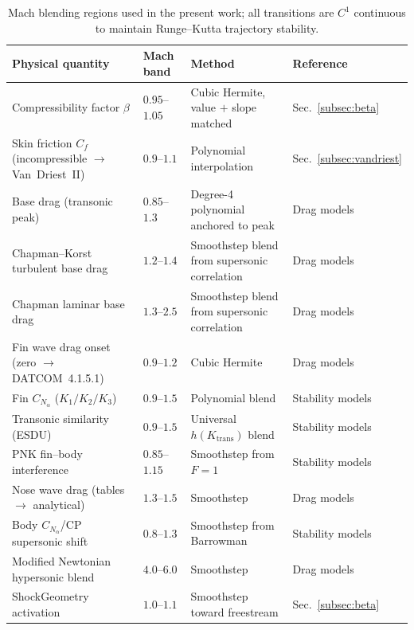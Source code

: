 \begin{table}[htbp]
  \centering
  \caption{Mach blending regions used in the present work; all transitions are
    $C^1$ continuous to maintain Runge--Kutta trajectory stability.}
  \label{tab:mach_blending}
  \begingroup\footnotesize
  \begin{tabularx}{\textwidth}{@{}X l X l@{}}
    \toprule
    Physical quantity & Mach band & Method & Reference \\
    \midrule
    Compressibility factor $\beta$
      & $0.95$--$1.05$ & Cubic Hermite, value $+$ slope matched
      & Sec.~\ref{subsec:beta} \\
    Skin friction $C_f$ (incompressible $\to$ Van~Driest~II)
      & $0.9$--$1.1$ & Polynomial interpolation
      & Sec.~\ref{subsec:vandriest} \\
    Base drag (transonic peak)
      & $0.85$--$1.3$ & Degree-4 polynomial anchored to peak & Drag models \\
    Chapman--Korst turbulent base drag
      & $1.2$--$1.4$ & Smoothstep blend from supersonic correlation
      & Drag models \\
    Chapman laminar base drag
      & $1.3$--$2.5$ & Smoothstep blend from supersonic correlation
      & Drag models \\
    Fin wave drag onset (zero $\to$ DATCOM~4.1.5.1)
      & $0.9$--$1.2$ & Cubic Hermite & Drag models \\
    Fin $C_{N_\alpha}$ ($K_1/K_2/K_3$)
      & $0.9$--$1.5$ & Polynomial blend & Stability models \\
    Transonic similarity (ESDU)
      & $0.9$--$1.5$ & Universal $h(K_{\mathrm{trans}})$ blend
      & Stability models \\
    PNK fin--body interference
      & $0.85$--$1.15$ & Smoothstep from $F=1$ & Stability models \\
    Nose wave drag (tables $\to$ analytical)
      & $1.3$--$1.5$ & Smoothstep & Drag models \\
    Body $C_{N_\alpha}$/CP supersonic shift
      & $0.8$--$1.3$ & Smoothstep from Barrowman & Stability models \\
    Modified Newtonian hypersonic blend
      & $4.0$--$6.0$ & Smoothstep & Drag models \\
    ShockGeometry activation
      & $1.0$--$1.1$ & Smoothstep toward freestream
      & Sec.~\ref{subsec:beta} \\
    \bottomrule
  \end{tabularx}
  \endgroup
\end{table}
